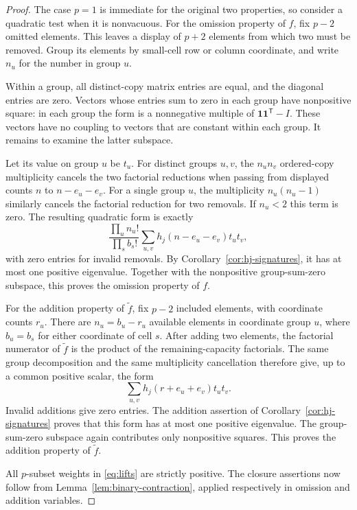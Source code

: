 \begin{proof}
The case \(p=1\) is immediate for the original two properties, so
consider a quadratic test when it is nonvacuous.
For the omission property of \(f\), fix \(p-2\) omitted elements.
This leaves a display of \(p+2\) elements from which two must be
removed.
Group its elements by small-cell row or column coordinate, and
write \(n_u\) for the number in group \(u\).

Within a group, all distinct-copy matrix entries are equal, and
the diagonal entries are zero.
Vectors whose entries sum to zero in each group have nonpositive
square: in each group the form is a nonnegative multiple of
\(\mathbf 1\mathbf 1^{\mathsf T}-I\).
These vectors have no coupling to vectors that are constant within
each group.
It remains to examine the latter subspace.

Let its value on group \(u\) be \(t_u\).
For distinct groups \(u,v\), the \(n_un_v\) ordered-copy
multiplicity cancels the two factorial reductions when passing
from displayed counts \(n\) to \(n-e_u-e_v\).
For a single group \(u\), the multiplicity \(n_u(n_u-1)\)
similarly cancels the factorial reduction for two removals.
If \(n_u<2\) this term is zero.
The resulting quadratic form is exactly
\[
 \frac{\prod_u n_u!}{\prod_s b_s!}
 \sum_{u,v}
 h_j(n-e_u-e_v)t_ut_v,
\]
with zero entries for invalid removals.
By Corollary~\ref{cor:hj-signatures}, it has at most one positive
eigenvalue.
Together with the nonpositive group-sum-zero subspace, this proves
the omission property of \(f\).

For the addition property of \(\widetilde f\), fix \(p-2\)
included elements, with coordinate counts \(r_u\).
There are \(n_u=b_u-r_u\) available elements in coordinate group
\(u\), where \(b_u=b_s\) for either coordinate of cell \(s\).
After adding two elements, the factorial numerator of
\(\widetilde f\) is the product of the remaining-capacity
factorials.
The same group decomposition and the same multiplicity cancellation
therefore give, up to a common positive scalar, the form
\[
 \sum_{u,v}h_j(r+e_u+e_v)t_ut_v.
\]
Invalid additions give zero entries.
The addition assertion of Corollary~\ref{cor:hj-signatures}
proves that this form has at most one positive eigenvalue.
The group-sum-zero subspace again contributes only nonpositive
squares.
This proves the addition property of \(\widetilde f\).

All \(p\)-subset weights in \eqref{eq:lifts} are strictly positive.
The closure assertions now follow from
Lemma~\ref{lem:binary-contraction}, applied respectively in omission
and addition variables.
\end{proof}

